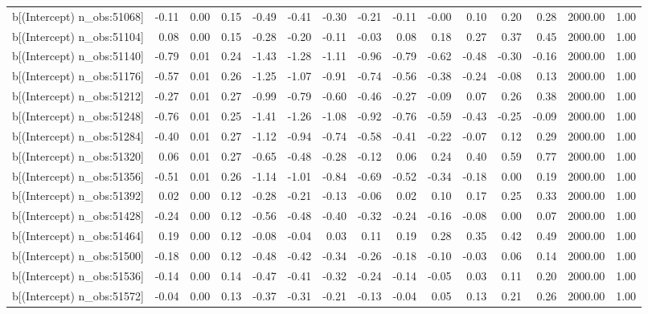 \begin{table}[ht]
\begin{tabular}{rrrrrrrrrrrrrrr}
  b[(Intercept) n\_obs:51068] & -0.11 & 0.00 & 0.15 & -0.49 & -0.41 & -0.30 & -0.21 & -0.11 & -0.00 & 0.10 & 0.20 & 0.28 & 2000.00 & 1.00 \\ 
  b[(Intercept) n\_obs:51104] & 0.08 & 0.00 & 0.15 & -0.28 & -0.20 & -0.11 & -0.03 & 0.08 & 0.18 & 0.27 & 0.37 & 0.45 & 2000.00 & 1.00 \\ 
  b[(Intercept) n\_obs:51140] & -0.79 & 0.01 & 0.24 & -1.43 & -1.28 & -1.11 & -0.96 & -0.79 & -0.62 & -0.48 & -0.30 & -0.16 & 2000.00 & 1.00 \\ 
  b[(Intercept) n\_obs:51176] & -0.57 & 0.01 & 0.26 & -1.25 & -1.07 & -0.91 & -0.74 & -0.56 & -0.38 & -0.24 & -0.08 & 0.13 & 2000.00 & 1.00 \\ 
  b[(Intercept) n\_obs:51212] & -0.27 & 0.01 & 0.27 & -0.99 & -0.79 & -0.60 & -0.46 & -0.27 & -0.09 & 0.07 & 0.26 & 0.38 & 2000.00 & 1.00 \\ 
  b[(Intercept) n\_obs:51248] & -0.76 & 0.01 & 0.25 & -1.41 & -1.26 & -1.08 & -0.92 & -0.76 & -0.59 & -0.43 & -0.25 & -0.09 & 2000.00 & 1.00 \\ 
  b[(Intercept) n\_obs:51284] & -0.40 & 0.01 & 0.27 & -1.12 & -0.94 & -0.74 & -0.58 & -0.41 & -0.22 & -0.07 & 0.12 & 0.29 & 2000.00 & 1.00 \\ 
  b[(Intercept) n\_obs:51320] & 0.06 & 0.01 & 0.27 & -0.65 & -0.48 & -0.28 & -0.12 & 0.06 & 0.24 & 0.40 & 0.59 & 0.77 & 2000.00 & 1.00 \\ 
  b[(Intercept) n\_obs:51356] & -0.51 & 0.01 & 0.26 & -1.14 & -1.01 & -0.84 & -0.69 & -0.52 & -0.34 & -0.18 & 0.00 & 0.19 & 2000.00 & 1.00 \\ 
  b[(Intercept) n\_obs:51392] & 0.02 & 0.00 & 0.12 & -0.28 & -0.21 & -0.13 & -0.06 & 0.02 & 0.10 & 0.17 & 0.25 & 0.33 & 2000.00 & 1.00 \\ 
  b[(Intercept) n\_obs:51428] & -0.24 & 0.00 & 0.12 & -0.56 & -0.48 & -0.40 & -0.32 & -0.24 & -0.16 & -0.08 & 0.00 & 0.07 & 2000.00 & 1.00 \\ 
  b[(Intercept) n\_obs:51464] & 0.19 & 0.00 & 0.12 & -0.08 & -0.04 & 0.03 & 0.11 & 0.19 & 0.28 & 0.35 & 0.42 & 0.49 & 2000.00 & 1.00 \\ 
  b[(Intercept) n\_obs:51500] & -0.18 & 0.00 & 0.12 & -0.48 & -0.42 & -0.34 & -0.26 & -0.18 & -0.10 & -0.03 & 0.06 & 0.14 & 2000.00 & 1.00 \\ 
  b[(Intercept) n\_obs:51536] & -0.14 & 0.00 & 0.14 & -0.47 & -0.41 & -0.32 & -0.24 & -0.14 & -0.05 & 0.03 & 0.11 & 0.20 & 2000.00 & 1.00 \\ 
  b[(Intercept) n\_obs:51572] & -0.04 & 0.00 & 0.13 & -0.37 & -0.31 & -0.21 & -0.13 & -0.04 & 0.05 & 0.13 & 0.21 & 0.26 & 2000.00 & 1.00 \\ 

\end{tabular}
\end{table}
